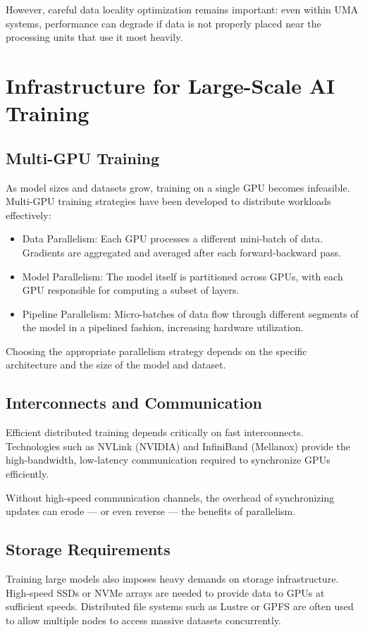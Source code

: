 \documentclass[openany]{book}
\begin{document}
However, careful data locality optimization remains important: even within UMA 
systems, performance can degrade if data is not properly placed near the 
processing units that use it most heavily.

\section{Infrastructure for Large-Scale AI Training}

\subsection{Multi-GPU Training}
As model sizes and datasets grow, training on a single GPU becomes infeasible. 
Multi-GPU training strategies have been developed to distribute workloads 
effectively:

\begin{itemize}
    \item Data Parallelism: Each GPU processes a different mini-batch of data. 
    Gradients are aggregated and averaged after each forward-backward pass.
    \item Model Parallelism: The model itself is partitioned across GPUs, with 
    each GPU responsible for computing a subset of layers.
    \item Pipeline Parallelism: Micro-batches of data flow through different 
    segments of the model in a pipelined fashion, increasing hardware 
    utilization.
\end{itemize}

Choosing the appropriate parallelism strategy depends on the specific 
architecture and the size of the model and dataset.

\subsection{Interconnects and Communication}
Efficient distributed training depends critically on fast interconnects. 
Technologies such as NVLink (NVIDIA) and InfiniBand (Mellanox) provide the 
high-bandwidth, low-latency communication required to synchronize GPUs 
efficiently.

Without high-speed communication channels, the overhead of synchronizing updates 
can erode — or even reverse — the benefits of parallelism.

\subsection{Storage Requirements}
Training large models also imposes heavy demands on storage infrastructure. 
High-speed SSDs or NVMe arrays are needed to provide data to GPUs at sufficient 
speeds. Distributed file systems such as Lustre or GPFS are often used to allow 
multiple nodes to access massive datasets concurrently.
\end{document}
